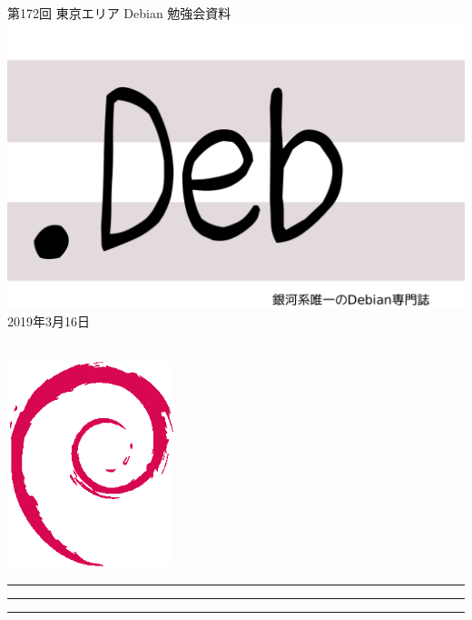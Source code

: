 \documentclass[mingoth,a4paper]{jsarticle}
\newcommand{\debmtgyear}{2019}
\newcommand{\debmtgmonth}{3}
\newcommand{\debmtgdate}{16}
\newcommand{\debmtgnumber}{172}
\begin{document}
\begin{titlepage}
\thispagestyle{empty}

\vspace*{-2cm}
第\debmtgnumber{}回 東京エリア Debian 勉強会資料\\
\hspace*{-2cm}
\includegraphics{image2012-natsu/dotdeb.pdf}\\
\hfill{}\debmtgyear{}年\debmtgmonth{}月\debmtgdate{}日

\\

\vspace*{-2cm}
\hfill{}\includegraphics[height=6cm]{image200502/openlogo-nd.eps}
\end{titlepage}

\newpage

\begin{minipage}[b]{0.2\hsize}
 \colorbox{titleback}{}
\end{minipage}
\begin{minipage}[b]{0.8\hsize}
\hrule
\vspace{2mm}
\hrule
\begin{multicols}{2}
\tableofcontents
\end{multicols}
\vspace{2mm}
\hrule
\end{minipage}
\end{document}
